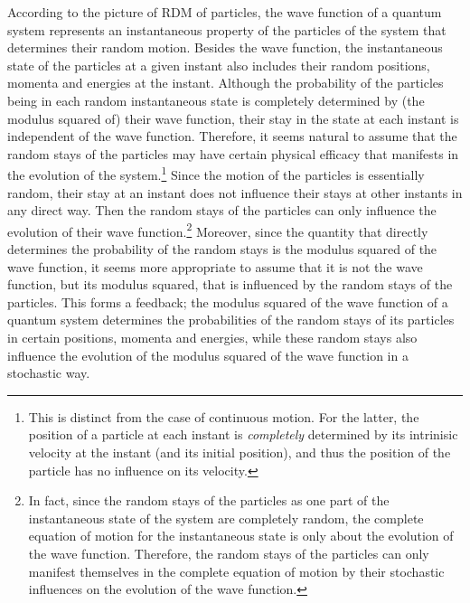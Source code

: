 According to the picture of RDM of particles, the wave function of a quantum system represents an instantaneous property of the particles of the system that determines their random motion. Besides the wave function, the instantaneous state of the particles at a given instant also includes their random positions, momenta and energies at the instant. 
Although the probability of the particles being in each random instantaneous state is completely determined by (the modulus squared of) their wave function, their stay in the state at each instant is independent of the wave function.
Therefore, it seems natural to assume that the random stays of the particles may have certain physical efficacy that manifests in the evolution of the system.\footnote{This is distinct from the case of continuous motion. For the latter, the position of a particle at each instant is \emph{completely} determined by its intrinisic velocity at the instant (and its initial position), and thus the position of the particle has no influence on its velocity.}
Since the motion of the particles is essentially random, their stay at an instant does not influence their stays at other instants in any direct way. Then the random stays of the particles can only influence the evolution of their wave function.\footnote{In fact, since the  random stays of the particles as one part of the instantaneous state of the system are completely random, the complete equation of motion for the instantaneous state is only about the evolution of the wave function. Therefore,  the random stays of the particles  can only manifest themselves in the complete equation of motion by their stochastic influences on the evolution of the wave function.}
Moreover, since the quantity that directly determines the probability of the random stays is the modulus squared of the wave function, it seems more appropriate to assume that it is not the wave function, but its modulus squared, that is influenced by the random stays of the particles.
This forms a feedback; the modulus squared of the wave function of a quantum system determines the probabilities of the random stays of its particles in certain positions, momenta and energies, while these random stays also influence the evolution of  the modulus squared of the wave function in a stochastic way.

